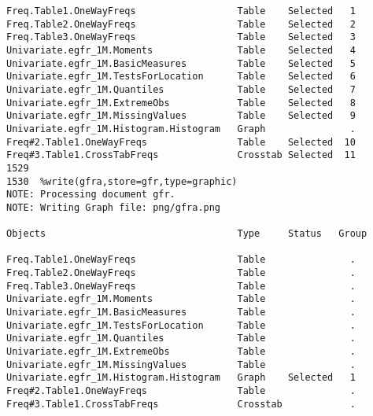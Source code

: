 \documentclass{article}\usepackage[]{graphicx}\usepackage[]{color}
\begin{document}
\begin{verbatim}
Freq.Table1.OneWayFreqs                  Table    Selected   1
Freq.Table2.OneWayFreqs                  Table    Selected   2
Freq.Table3.OneWayFreqs                  Table    Selected   3
Univariate.egfr_1M.Moments               Table    Selected   4
Univariate.egfr_1M.BasicMeasures         Table    Selected   5
Univariate.egfr_1M.TestsForLocation      Table    Selected   6
Univariate.egfr_1M.Quantiles             Table    Selected   7
Univariate.egfr_1M.ExtremeObs            Table    Selected   8
Univariate.egfr_1M.MissingValues         Table    Selected   9
Univariate.egfr_1M.Histogram.Histogram   Graph               .
Freq#2.Table1.OneWayFreqs                Table    Selected  10
Freq#3.Table1.CrossTabFreqs              Crosstab Selected  11
1529
1530  %write(gfra,store=gfr,type=graphic)
NOTE: Processing document gfr.
NOTE: Writing Graph file: png/gfra.png

Objects                                  Type     Status   Group

Freq.Table1.OneWayFreqs                  Table               .
Freq.Table2.OneWayFreqs                  Table               .
Freq.Table3.OneWayFreqs                  Table               .
Univariate.egfr_1M.Moments               Table               .
Univariate.egfr_1M.BasicMeasures         Table               .
Univariate.egfr_1M.TestsForLocation      Table               .
Univariate.egfr_1M.Quantiles             Table               .
Univariate.egfr_1M.ExtremeObs            Table               .
Univariate.egfr_1M.MissingValues         Table               .
Univariate.egfr_1M.Histogram.Histogram   Graph    Selected   1
Freq#2.Table1.OneWayFreqs                Table               .
Freq#3.Table1.CrossTabFreqs              Crosstab            .

\end{verbatim}
\end{document}
